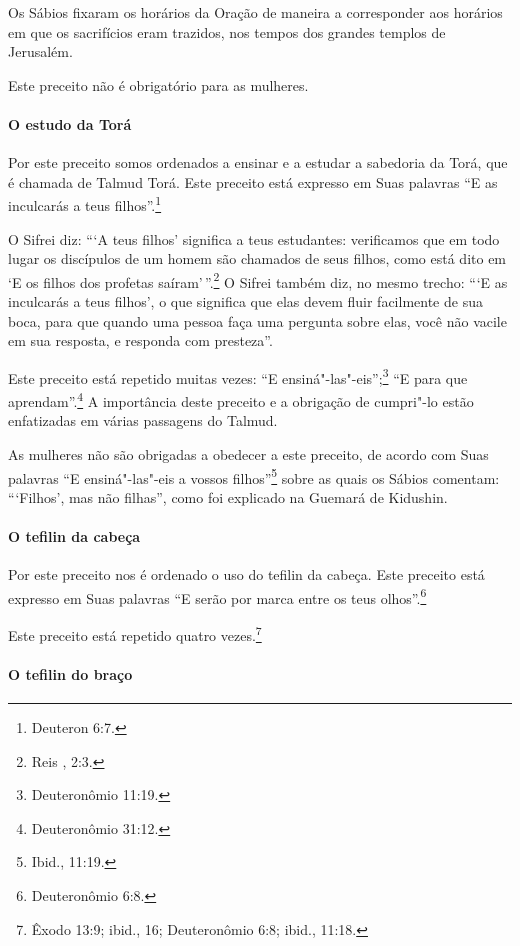 \begin{multicols}{2}
Os Sábios fixaram os horários da Oração de maneira a corresponder aos
horários em que os sacrifícios eram trazidos, nos tempos dos grandes
templos de Jerusalém.

Este preceito não é obrigatório para as mulheres.

\paragraph{O estudo da Torá\starr{}}

Por este preceito somos ordenados a ensinar e a estudar a sabedoria da
Torá\starr, que é chamada de Talmud Torá\starr. Este preceito está expresso em
Suas palavras ``E as inculcarás a teus filhos''.\footnote{Deuteron 6:7.}

O Sifrei\starr{} diz: ```A teus filhos' significa a teus estudantes: verificamos
que em todo lugar os discípulos de um homem são chamados de seus filhos,
como está dito em `E os filhos dos profetas saíram'\,''.\footnote{Reis , 2:3.} O Sifrei\starr{} também diz,
no mesmo trecho: ```E as inculcarás a teus filhos', o que significa que
elas devem fluir facilmente de sua boca, para que quando uma pessoa faça uma
pergunta sobre elas, você não vacile em sua resposta, e responda com
presteza''.

Este preceito está repetido muitas vezes: ``E ensiná"-las"-eis'';\footnote{Deuteronômio 11:19.} ``E para que aprendam''.\footnote{Deuteronômio 31:12.} A
importância deste preceito e a obrigação de cumpri"-lo estão enfatizadas
em várias passagens do Talmud\starr.

As mulheres não são obrigadas a obedecer a este preceito, de acordo com
Suas palavras ``E ensiná"-las"-eis a vossos filhos''\footnote{Ibid., 11:19.} sobre
as quais os Sábios comentam: ```Filhos', mas não filhas'', como foi
explicado na Guemará\starr{} de Kidushin\starr.

\paragraph{O tefilin\starr{} da cabeça}

Por este preceito nos é ordenado o uso do tefilin\starr{} da cabeça. Este
preceito está expresso em Suas palavras ``E serão por marca entre os
teus olhos''.\footnote{Deuteronômio 6:8.}

Este preceito está repetido quatro vezes.\footnote{Êxodo 13:9; ibid., 16;
Deuteronômio 6:8; ibid., 11:18.}

\paragraph{O tefilin\starr{} do braço}


\end{multicols}
